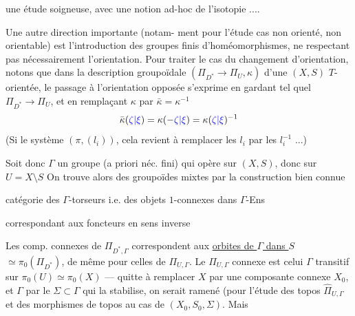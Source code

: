 
une étude soigneuse, avec une notion
ad-hoc de l'isotopie ....

Une autre direction importante (notam-
ment pour l'étude  cas non orienté,
non orientable) est l'introduction des
groupes finis d'homéomorphismes, ne
respectant pas nécessairement l'orientation.
Pour traiter le cas du changement d'orientation,
notons que dans la description groupoïdale
$(\Pi_{D^*}\longrightarrow\Pi_U,\kappa)$ d'une $(X,S)$ $T$-orientée,
le passage à l'orientation opposée s'exprime en
gardant tel quel $\Pi_{D^*}\longrightarrow\Pi_U$, et en
remplaçant $\kappa$ par $\bar\kappa=\kappa^{-1}$
\[
\bar\kappa(\textcolor{blue}{\zeta|\xi})=\kappa(-\textcolor{blue}{\zeta|\xi})=\kappa(\textcolor{blue}{\zeta|\xi})^{-1}
\]
(Si  le système $(\pi,(l_i))$, cela revient à
remplacer les $l_i$ par les $l_i^{-1}$ ...)

Soit donc $\Gamma$ un groupe (a priori
 néc. fini) qui opère sur $(X,S)$, donc
sur $U=X\setminus S$  On trouve alors des
groupoïdes  mixtes  par la construction bien connue


catégorie des $\Gamma$-torseurs
i.e. des objets $1$-connexes
dans $\Gamma$-Ens

correspondant aux foncteurs en sens inverse


Les comp. connexes de $\Pi_{D^*,\Gamma}$ correspondent
aux \uline{orbites de $\Gamma$ dans $S$}  $\simeq\pi_0(\Pi_{D^*})$,
de même pour celles de $\Pi_{U,\Gamma}$. Le 
$\Pi_{U,\Gamma}$ connexe 
est celui  $\Gamma$ transitif
sur $\pi_0(U)\simeq\pi_0(X)$ --- quitte à remplacer
$X$ par une composante connexe $X_0$, et $\Gamma$
par le  $\Sigma\subset\Gamma$ qui la stabilise,
on serait ramené (pour l'étude des
topos $\widehat\Pi_{U,\Gamma}$ et des morphismes de topos
au cas de $(X_0,S_0,\Sigma)$. Mais 

